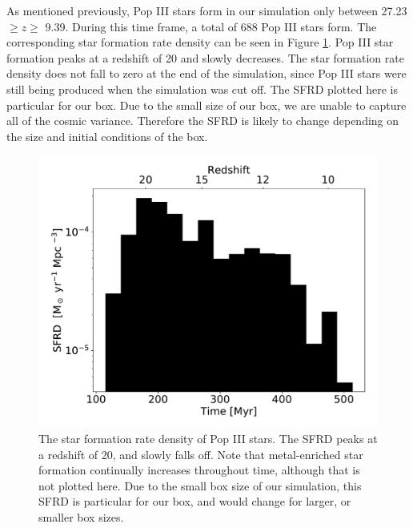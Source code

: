 \documentclass[a4paper,fleqn,usenatbib]{mnras}
\begin{document}
As mentioned previously, Pop III stars form in our simulation only between 27.23 $\geq z \geq$ 9.39. During this time frame, a total of 688 Pop III stars form. The corresponding star formation rate density can be seen in Figure \ref{fig:pop3_SFR_bar}. Pop III star formation peaks at a redshift of 20 and slowly decreases. The star formation rate density does not fall to zero at the end of the simulation, since Pop III stars were still being produced when the simulation was cut off. The SFRD plotted here is particular for our box. Due to the small size of our box, we are unable to capture all of the cosmic variance. Therefore the SFRD is likely to change depending on the size and initial conditions of the box.

\begin{figure}
	\includegraphics[width=\columnwidth]{images/pop3_SFR_bar.pdf}
    \caption{The star formation rate density of Pop III stars. The SFRD peaks at a redshift of 20, and slowly falls off. Note that metal-enriched star formation continually increases throughout time, although that is not plotted here. Due to the small box size of our simulation, this SFRD is particular for our box, and would change for larger, or smaller box sizes.}
    \label{fig:pop3_SFR_bar}
\end{figure}

\end{document}
